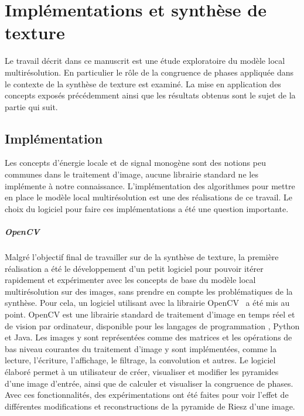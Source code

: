 \chapter{Implémentations et synthèse de texture}
\label{ch:chapitre2}

Le travail décrit dans ce manuscrit est une étude exploratoire du modèle local multirésolution. En particulier le rôle de la congruence de phases appliquée dans le contexte de la synthèse de texture est examiné. La mise en application des concepts exposés précédemment ainsi que les résultats obtenus sont le sujet de la partie qui suit.

\section{Implémentation}

Les concepts d'énergie locale et de signal monogène sont des notions peu communes dans le traitement d'image, aucune librairie standard ne les implémente à notre connaissance. L'implémentation des algorithmes pour mettre en place le modèle local multirésolution est une des réalisations de ce travail. Le choix du logiciel pour faire ces implémentations a été une question importante.


\paragraph{OpenCV}

Malgré l'objectif final de travailler sur de la synthèse de texture, la première réalisation a été le développement d'un petit logiciel pour pouvoir itérer rapidement et expérimenter avec les concepts de base du modèle local multirésolution sur des images, sans prendre en compte les problématiques de la synthèse. Pour cela, un logiciel utilisant \cpp avec la librairie OpenCV~\cite{opencv_library} a été mis au point. OpenCV est une librairie standard de traitement d'image en temps réel et de vision par ordinateur, disponible pour les langages de programmation \cpp, Python et Java. Les images y sont représentées comme des matrices et les opérations de bas niveau courantes du traitement d'image y sont implémentées, comme la lecture, l'écriture, l'affichage, le filtrage, la convolution et autres. Le logiciel élaboré permet à un utilisateur de créer, visualiser et modifier les pyramides d'une image d'entrée, ainsi que de calculer et visualiser la congruence de phases. Avec ces fonctionnalités, des expérimentations ont été faites pour voir l'effet de différentes modifications et reconstructions de la pyramide de Riesz d'une image.

